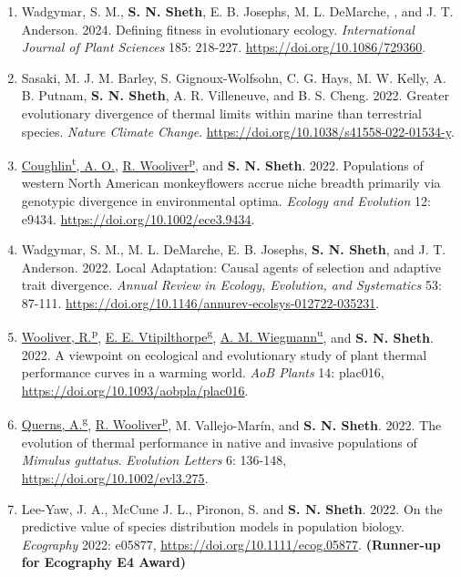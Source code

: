 \documentclass[11pt,english]{article}
\begin{document}
\begin{hangparas}{.5in}{1}
\begin{enumerate}
\item Wadgymar, S. M., \textbf{S. N. Sheth}, E. B. Josephs, M. L. DeMarche, , and J. T. Anderson. 2024. Defining fitness in evolutionary ecology. \emph{International Journal of Plant Sciences} 185: 218-227. \url{https://doi.org/10.1086/729360}.

\item Sasaki, M. J. M. Barley, S. Gignoux-Wolfsohn, C. G. Hays, M. W. Kelly, A. B. Putnam, \textbf{S. N. Sheth}, A. R. Villeneuve, and B. S. Cheng. 2022. Greater evolutionary divergence of thermal limits within marine than terrestrial species. \emph{Nature Climate Change}. \url{https://doi.org/10.1038/s41558-022-01534-y}.

\item \underline{Coughlin\textsuperscript{t}, A. O.}, \underline{R. Wooliver\textsuperscript{p}}, and \textbf{S. N. Sheth}. 2022. Populations of western North American monkeyflowers accrue niche breadth primarily via genotypic divergence in environmental optima. \emph{Ecology and Evolution} 12: e9434. \url{https://doi.org/10.1002/ece3.9434}. 

\item Wadgymar, S. M., M. L. DeMarche, E. B. Josephs, \textbf{S. N. Sheth}, and J. T. Anderson. 2022. Local Adaptation: Causal agents of selection and adaptive trait divergence. \emph{Annual Review in Ecology, Evolution, and Systematics} 53: 87-111. \url{https://doi.org/10.1146/annurev-ecolsys-012722-035231}.

\item \underline{Wooliver, R.\textsuperscript{p}}, \underline{E. E. Vtipilthorpe\textsuperscript{g}}, \underline{A. M. Wiegmann\textsuperscript{u}}, and \textbf{S. N. Sheth}. 2022. A viewpoint on ecological and evolutionary study of plant thermal performance curves in a warming world. \emph{AoB Plants} 14: plac016, \url{https://doi.org/10.1093/aobpla/plac016}. 

\item \underline{Querns, A.\textsuperscript{g}}, \underline{R. Wooliver\textsuperscript{p}}, M. Vallejo-Mar\'in, and \textbf{S. N. Sheth}. 2022. The evolution of thermal performance in native and invasive populations of \emph{Mimulus guttatus}. \emph{Evolution Letters} 6: 136-148, \url{https://doi.org/10.1002/evl3.275}.

\item Lee-Yaw, J. A., McCune J. L., Pironon, S. and \textbf{S. N. Sheth}. 2022. On the predictive value of species distribution models in population biology. \emph{Ecography} 2022: e05877, \url{https://doi.org/10.1111/ecog.05877}. \textbf{(Runner-up for Ecography E4 Award)}


\end{enumerate}
\end{hangparas}
\end{document}
